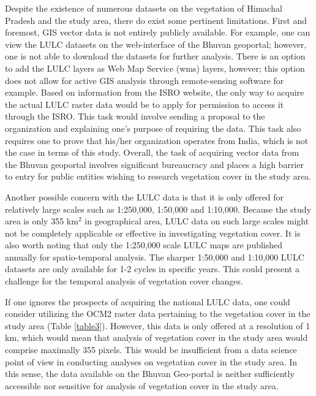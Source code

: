 \justify
Despite the existence of numerous datasets on the vegetation of Himachal Pradesh and the study area, there do exist some pertinent limitations. First and foremost, GIS vector data is not entirely publicly available. For example, one can view the LULC datasets on the web-interface of the Bhuvan geoportal; however, one is not able to download the datasets for further analysis. There is an option to add the LULC layers as Web Map Service (\ac{wms}) layers, however; this option does not allow for active GIS analysis through remote-sensing software for example. Based on information from the ISRO website, the only way to acquire the actual LULC raster data would be to apply for permission to access it through the ISRO. This task would involve sending a proposal to the organization and explaining one's purpose of requiring the data. This task also requires one to prove that his/her organization operates from India, which is not the case in terms of this study. Overall, the task of acquiring vector data from the Bhuvan geoportal involves significant bureaucracy and places a high barrier to entry for public entities wishing to research vegetation cover in the study area.

\vfill

\justify
Another possible concern with the LULC data is that it is only offered for relatively large scales such as 1:250,000, 1:50,000 and 1:10,000. Because the study area is only 355 km$^2$ in geographical area, LULC data on such large scales might not be completely applicable or effective in investigating vegetation cover. It is also worth noting that only the 1:250,000 scale LULC maps are published annually for spatio-temporal analysis. The sharper 1:50,000 and 1:10,000 LULC datasets are only available for 1-2 cycles in specific years. This could present a challenge for the temporal analysis of vegetation cover changes.

\justify
If one ignores the prospects of acquiring the national LULC data, one could consider utilizing the OCM2 raster data pertaining to the vegetation cover in the study area (Table \ref{table3}). However, this data is only offered at a resolution of 1 km, which would mean that analysis of vegetation cover in the study area would comprise maximally 355 pixels. This would be insufficient from a data science point of view in conducting analyses on vegetation cover in the study area. In this sense, the data available on the Bhuvan Geo-portal is neither sufficiently accessible nor sensitive for analysis of vegetation cover in the study area. 

